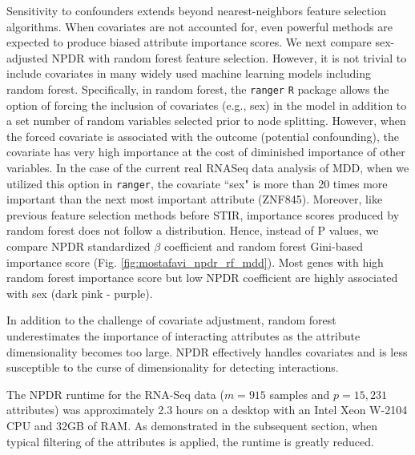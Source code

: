 \documentclass[10pt]{article}
\begin{document}
Sensitivity to confounders extends beyond nearest-neighbors feature selection algorithms.  
When covariates are not accounted for, even powerful methods are expected to produce biased attribute importance scores.
We next compare sex-adjusted NPDR with random forest feature selection. 
However, it is not trivial to include covariates in many widely used machine learning models including random forest.
Specifically, in random forest, the \texttt{ranger} \texttt{R} package allows the option of forcing the inclusion of covariates (e.g., sex) in the model in addition to a set number of random variables selected prior to node splitting.
However, when the forced covariate is associated with the outcome (potential confounding), the covariate has very high importance at the cost of diminished importance of other variables.
In the case of the current real RNASeq data analysis of MDD, when we utilized this option in \texttt{ranger}, the covariate ``sex" is more than 20 times more important than the next most important attribute (ZNF845).
Moreover, like previous feature selection methods before STIR, importance scores produced by random forest does not follow a distribution.
Hence, instead of P values, we compare NPDR standardized $\beta$ coefficient and random forest Gini-based importance score (Fig. \ref{fig:mostafavi_npdr_rf_mdd}).
Most genes with high random forest importance score but low NPDR coefficient are highly associated with sex (dark pink - purple).

In addition to the challenge of covariate adjustment, random forest underestimates the importance of interacting attributes as the attribute dimensionality becomes too large\cite{mckinney2009capturing,winham2012snp}. NPDR effectively handles covariates and is less susceptible to the curse of dimensionality for detecting interactions. 


The NPDR runtime for the RNA-Seq data ($m=915$ samples and $p=15,231$ attributes) was approximately 2.3 hours on a desktop with an Intel Xeon W-2104 CPU and 32GB of RAM.
As demonstrated in the subsequent section, when typical filtering of the attributes is applied, the runtime is greatly reduced.

\end{document}
